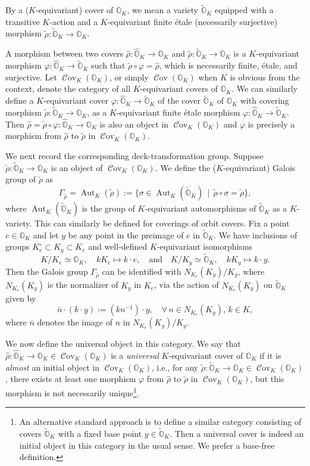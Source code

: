 \documentclass[11pt, a4paper]{amsart}
\newcommand{\orb}{\mathbb{O}}
\newcommand{\orbk}{\orb_{K}}
\newcommand{\torbk}{\widetilde{\orb}_{K}}
\newcommand{\horbk}{\widehat{\orb}_{K}}
\DeclareMathOperator{\Aut}{Aut}
\DeclareMathOperator{\Cov}{\mathcal{C}ov}
\theoremstyle{definition}
\numberwithin{equation}{section}
\begin{document}
By a ($K$-equivariant) cover of $\orbk$, we mean a variety $\torbk$ equipped with a transitive $K$-action and a $K$-equivariant finite \'{e}tale (necessarily surjective) morphism $\tilde{\rho}: \torbk \to \orbk$.

A morphism between two covers $\hat{\rho}: \horbk \to \orbk$ and $\tilde{\rho}: \torbk \to \orbk$ is a $K$-equivariant morphism $\varphi: \horbk \to \torbk$ such that $\tilde{\rho} \circ \varphi = \hat{\rho}$, which is necessarily finite, \'{e}tale, and surjective. Let $\Cov_K(\orbk)$, or simply $\Cov(\orbk)$ when $K$ is obvious from the context, denote the category of all $K$-equivariant covers of $\orbk$. We can similarly define a $K$-equivariant cover $\varphi: \horbk \to \torbk$ of the cover $\torbk$ of $\orbk$ with covering morphism $\tilde{\rho}: \torbk \to \orbk$, as a $K$-equivariant finite \'{e}tale morphism $\varphi: \horbk \to \torbk$. Then $\hat{\rho} = \tilde{\rho} \circ \varphi: \horbk \to \orbk$ is also an object in $\Cov_K(\orbk)$ and $\varphi$ is precisely a morphism from $\hat{\rho}$ to $\tilde{\rho}$ in $\Cov_K(\orbk)$. 

We next record the corresponding deck-transformation group. Suppose $\tilde{\rho}: \torbk \to \orbk$ is an object of $\Cov_K(\orbk)$. We define the ($K$-equivariant) Galois group of $\tilde{\rho}$ as
	\[ \Gamma_{\tilde{\rho}} = \Aut_K(\tilde{\rho}) := \{ \sigma \in \Aut_K(\torbk) \,\mid\, \tilde{\rho} \circ \sigma = \tilde{\rho} \},\]
where $\Aut_K(\torbk)$ is the group of $K$-equivariant automorphisms of $\torbk$ as a $K$-variety. This can similarly be defined for coverings of orbit covers.
Fix a point $e \in \orbk$ and let $y$ be any point in the preimage of $e$ in $\torbk$. We have inclusions of groups $K_e^\circ \subset K_y \subset K_e$ and well-defined $K$-equivariant isomorphisms 
	\[ K/K_e \simeq \orbk, \quad k K_e \mapsto k \cdot e, \quad \text{and} \quad K/K_y \simeq \torbk, \quad k K_y \mapsto k \cdot y.\]
Then the Galois group $\Gamma_{\tilde{\rho}}$ can be identified with $N_{K_e}(K_y)/K_y$, where $N_{K_e}(K_y)$ is the normalizer of $K_y$ in $K_e$, via the action of $N_{K_e}(K_y)$ on $\torbk$ given by
\begin{equation}\label{eq:Aut_K}
	 \bar{n} \cdot (k \cdot y) := (k n^{-1}) \cdot y, \quad \forall\, n \in N_{K_e}(K_y), \, k \in K,
\end{equation}
where $\bar{n}$ denotes the image of $n$ in $N_{K_e}(K_y)/K_y$.

We now define the universal object in this category. We say that $\hat{\rho}: \horbk \to \orbk \in \Cov_K(\orbk)$ is a \emph{universal} $K$-equivariant cover of $\orbk$ if it is \emph{almost} an initial object in $\Cov_K(\orbk)$, i.e., for any $\tilde{\rho}: \torbk \to \orbk \in \Cov_K(\orbk)$, there exists at least one morphism $\varphi$ from $\hat{\rho}$ to $\tilde{\rho}$ in $\Cov_K(\orbk)$, but this morphism is not necessarily unique\footnote{An alternative standard approach is to define a similar category consisting of covers $\torbk$ with a fixed base point $y \in \torbk$. Then a universal cover is indeed an initial object in this category in the usual sense. We prefer a base-free definition.}.
\end{document}
